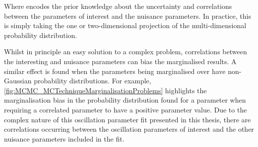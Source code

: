 Where  encodes the prior knowledge about the uncertainty and correlations between the parameters of interest and the nuisance parameters. In practice, this is simply taking the one or two-dimensional projection of the multi-dimensional probability distribution.

Whilst in principle an easy solution to a complex problem, correlations between the interesting and nuisance parameters can bias the marginalised results. A similar effect is found when the parameters being marginalised over have non-Gaussian probability distributions. For example, \autoref{fig:MCMC_MCTechniqueMarginalisationProblems} highlights the marginalisation bias in the probability distribution found for a parameter when requiring a correlated parameter to have a positive parameter value. Due to the complex nature of this oscillation parameter fit presented in this thesis, there are correlations occurring between the oscillation parameters of interest and the other nuisance parameters included in the fit.

